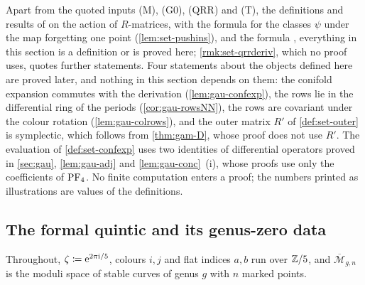 Apart from the quoted inputs (M), (G0), (QRR) and (T), the definitions and results of \cite{PPZ15} on the action of $R$-matrices, with the formula \cite[(8)]{PPZ15} for the classes $\psi$ under the map forgetting one point (\cref{lem:set-pushins}), and the formula \cite[(1.7)]{AC96}, everything in this section is a definition or is proved here; \cref{rmk:set-qrrderiv}, which no proof uses, quotes further statements. Four statements about the objects defined here are proved later, and nothing in this section depends on them: the conifold expansion commutes with the derivation (\cref{lem:gau-confexp}), the rows lie in the differential ring of the periods (\cref{cor:gau-rowsNN}), the rows are covariant under the colour rotation (\cref{lem:gau-colrows}), and the outer matrix $R'$ of \cref{def:set-outer} is symplectic, which follows from \cref{thm:gam-D}, whose proof does not use $R'$. The evaluation of \cref{def:set-confexp} uses two identities of differential operators proved in \cref{sec:gau}, \cref{lem:gau-adj} and \cref{lem:gau-conc}~(i), whose proofs use only the coefficients of $\mathrm{PF}_{4}$. No finite computation enters a proof; the numbers printed as illustrations are values of the definitions.

\subsection{The formal quintic and its genus-zero data}
\label{sec:set-fq}

Throughout, $\zeta\coloneqq\mathrm{e}^{2\pi\mathrm{i}/5}$, colours $i,j$ and flat indices $a,b$ run over $\mathbb{Z}/5$, and $\overline{\mathcal M}_{g,n}$ is the moduli space of stable curves of genus $g$ with $n$ marked points.

